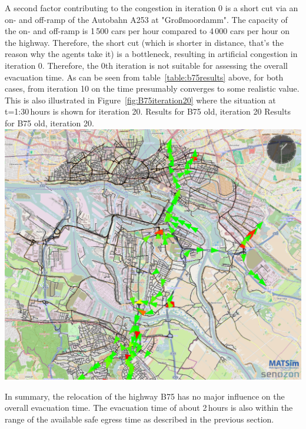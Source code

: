 {}
%
A second factor contributing to the congestion in iteration 0 is a short cut via an on- and off-ramp of the Autobahn A253 at "Gro{\ss}moordamm". The capacity of the on- and off-ramp is 1\,500 cars per hour compared to 4\,000 cars per hour on the highway. Therefore, the short cut (which is shorter in distance, that's the reason why the agents take it) is a bottleneck, resulting in artificial congestion in iteration 0.
Therefore, the 0th iteration is not suitable for assessing the overall evacuation time. As can be seen from table~\ref{table:b75results} above, for both cases, from iteration 10 on the time presumably converges to some realistic value. This is also illustrated in Figure~\ref{fig:B75iteration20} where the situation at t=1:30\,hours is shown for iteration 20.
%
\createfigure%
{Results for B75 old, iteration 20}%
{Results for B75 old, iteration 20.}%
{\label{fig:B75iteration20}}%
{\includegraphics[width=0.7\linewidth]{using/figures/B75iteration20}}%
{}

In summary, the relocation of the highway B75 has no major influence on the overall evacuation time. The evacuation time of about 2\,hours is also within the range of the available safe egress time as described in the previous section. 

